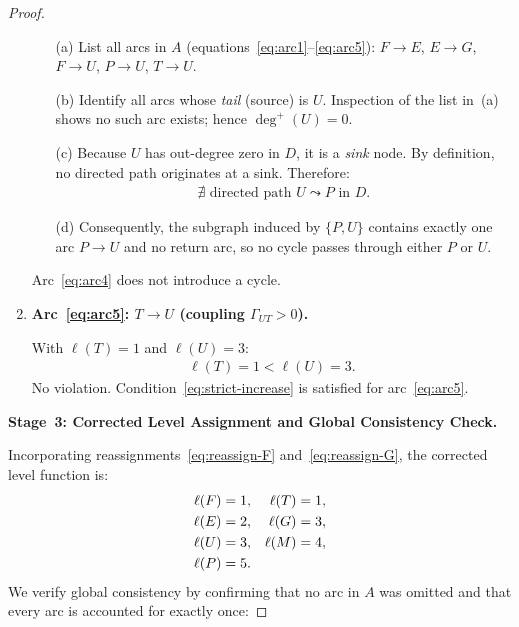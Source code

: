 \documentclass[12pt,openany]{book}
\newcommand{\calE}{\mathcal{E}}
\newcommand{\calF}{\mathcal{F}}
\newcommand{\calG}{\mathcal{G}}
\newcommand{\calP}{\mathcal{P}}
\newcommand{\calU}{\mathcal{U}}
\newcommand{\calM}{\mathcal{M}}
\newcommand{\calT}{\mathcal{T}}
\numberwithin{equation}{chapter}
\theoremstyle{plain}
\theoremstyle{definition}
\theoremstyle{remark}
\def\mathcal#1{#1}%
\begin{document}
\begin{proof}
\begin{enumerate}
        \begin{enumerate}
          \item[(a)] List all arcs in $\mathcal{A}$
                (equations~\eqref{eq:arc1}--\eqref{eq:arc5}):
                $\calF\!\to\!\calE$,\;
                $\calE\!\to\!\calG$,\;
                $\calF\!\to\!\calU$,\;
                $\calP\!\to\!\calU$,\;
                $\calT\!\to\!\calU$.
          \item[(b)] Identify all arcs whose
                \emph{tail} (source) is $\calU$.
                Inspection of the list in~(a) shows no
                such arc exists; hence
                $\deg^+(\calU) = 0$.
          \item[(c)] Because $\calU$ has out-degree zero
                in $\mathcal{D}$, it is a \emph{sink}
                node.  By definition, no directed path
                originates at a sink.  Therefore:
                \begin{align}
                  \nexists\text{ directed path }
                  \calU \leadsto \calP
                  \text{ in }\mathcal{D}.
                  \label{eq:no-path-U-P}
                \end{align}
          \item[(d)] Consequently, the subgraph induced
                by $\{\calP, \calU\}$ contains exactly
                one arc $\calP \to \calU$ and no return
                arc, so no cycle passes through either
                $\calP$ or $\calU$.
        \end{enumerate}
        Arc~\eqref{eq:arc4} does not introduce a cycle.
        \checkmark

  \item \textbf{Arc~\eqref{eq:arc5}:
        $\calT \to \calU$
        (coupling $\Gamma_{\calU\calT} > 0$).}

        With $\ell(\calT) = 1$ and $\ell(\calU) = 3$:
        \begin{align}
          \ell(\calT) = 1 < \ell(\calU) = 3.
          \label{eq:check-arc5}
        \end{align}
        No violation.  Condition~\eqref{eq:strict-increase}
        is satisfied for arc~\eqref{eq:arc5}.  \checkmark
\end{enumerate}

\medskip
\noindent\textbf{Stage~3: Corrected Level Assignment and
Global Consistency Check.}

\noindent
Incorporating reassignments~\eqref{eq:reassign-F}
and~\eqref{eq:reassign-G}, the corrected level function is:
\begin{align}
  \ell(\calF) &= 1, &  \ell(\calT) &= 1, \notag \\
  \ell(\calE) &= 2, &  \ell(\calG) &= 3, \notag \\
  \ell(\calU) &= 3, &  \ell(\calM) &= 4, \notag \\
  \ell(\calP) &= 5. &               &
  \label{eq:levels-corrected}
\end{align}
We verify global consistency by confirming that no arc in
$\mathcal{A}$ was omitted and that every arc is accounted
for exactly once:


\end{proof}
\end{document}
